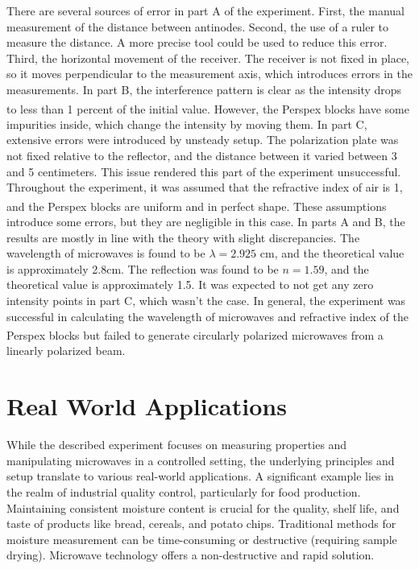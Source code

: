 \documentclass[10pt]{article}
\begin{document}
There are several sources of error in part A of the experiment. First, the manual measurement of the distance between antinodes. Second, the use of a ruler to measure the distance. A more precise tool could be used to reduce this error. Third, the horizontal movement of the receiver. The receiver is not fixed in place, so it moves perpendicular to the measurement axis, which introduces errors in the measurements. In part B, the interference pattern is clear as the intensity drops to less than 1 percent of the initial value. However, the Perspex\textsuperscript{\textregistered} blocks have some impurities inside, which change the intensity by moving them. In part C, extensive errors were introduced by unsteady setup. The polarization plate was not fixed relative to the reflector, and the distance between it varied between 3 and 5 centimeters. This issue rendered this part of the experiment unsuccessful. Throughout the experiment, it was assumed that the refractive index of air is 1, and the Perspex\textsuperscript{\textregistered} blocks are uniform and in perfect shape. These assumptions introduce some errors, but they are negligible in this case. In parts A and B, the results are mostly in line with the theory with slight discrepancies. The wavelength of microwaves is found to be $\lambda = 2.925$ cm, and the theoretical value is approximately 2.8cm. The reflection was found to be $n = 1.59$, and the theoretical value is approximately 1.5. It was expected to not get any zero intensity points in part C, which wasn't the case. In general, the experiment was successful in calculating the wavelength of microwaves and refractive index of the Perspex\textsuperscript{\textregistered} blocks but failed to generate circularly polarized microwaves from a linearly polarized beam.

\section{Real World Applications}

While the described experiment focuses on measuring properties and manipulating microwaves in a controlled setting, the underlying principles and setup translate to various real-world applications. A significant example lies in the realm of industrial quality control, particularly for food production. Maintaining consistent moisture content is crucial for the quality, shelf life, and taste of products like bread, cereals, and potato chips. Traditional methods for moisture measurement can be time-consuming or destructive (requiring sample drying). Microwave technology offers a non-destructive and rapid solution.
\end{document}
